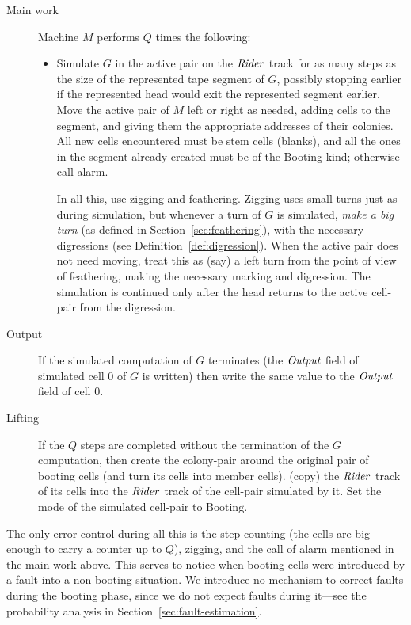 \documentclass[11pt]{memoir}
\theoremstyle{definition} %
\newcommand{\fld}[1]{\ensuremath{\textit{#1\/}}}
\def\G{G} %
\newcommand{\Q}{Q} %
\newcommand{\Output}{\fld{Output}}
\newcommand{\Rider}{\fld{Rider}} %
\newcommand{\Booting}{\mathrm{Booting}}
\begin{document}
\begin{description}
  \item[Main work]
Machine \( M \) performs \( \Q \) times the following:
\begin{itemize}
\item[] 
  Simulate \( \G \) in the active pair on the \( \Rider \) track
  for as many steps as the size of the represented
  tape segment of \( \G \), possibly stopping earlier if the represented head would exit the represented
  segment earlier.
  Move the active pair of \( M \) left or right as needed,
  adding cells to the segment, and giving them the appropriate addresses of their colonies.
  All new cells encountered must be stem cells (blanks), and all the ones in the segment already created
  must be of the Booting kind; otherwise call alarm.

  In all this, use zigging and feathering.
  Zigging uses small turns just as during simulation, but 
  whenever a turn of \( \G \) is simulated, \emph{make a big turn}
  (as defined in Section~\ref{sec:feathering}), with the necessary
  digressions (see Definition~\ref{def:digression}).
  When the active pair does not need moving, treat this as (say) a left turn from the
  point of view of feathering, making the necessary marking and digression.
  The simulation is continued only after the head returns to the active cell-pair from the digression.
  
\end{itemize}
\item[Output]
If the simulated computation of \( \G \) terminates (the \( \Output \)
field of simulated cell 0 of \( \G \) is written)
then write the same value to the \( \Output \) field of cell 0.
\item[Lifting]
  If the \( \Q \) steps are completed without the termination of the \( \G \) computation, then
  create the colony-pair around the original pair of booting cells (and turn its cells into member cells).
  (copy) the \( \Rider \) track of its cells into
  the \( \Rider \) track of the cell-pair simulated by it.
  Set the mode of the simulated cell-pair to \( \Booting \).
\end{description}

The only error-control during all this is the step counting (the cells are big enough
to carry a counter up to \( \Q \)), zigging, and the call of alarm mentioned in the main work above.
This serves to notice when booting cells were introduced by a fault
into a non-booting situation.
We introduce no mechanism to correct faults during the booting phase, since
we do not expect faults
during it---see the probability analysis in Section~\ref{sec:fault-estimation}.
\end{document}
